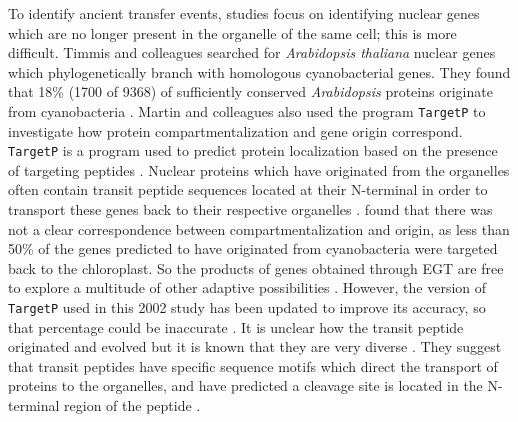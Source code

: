 \documentclass[a4paper,12pt]{article}
\newcommand{\tget}{\mbox{\texttt{TargetP}}\xspace}
\begin{document}
\begin{multicols}{2}
To identify ancient transfer events, studies focus on identifying
nuclear genes which are no longer present in the organelle of the
same cell; this is more difficult. Timmis and colleagues searched for
\textit{Arabidopsis thaliana} nuclear genes which phylogenetically branch
with homologous cyanobacterial genes. They found that 18\% (1700 of 9368)
of sufficiently conserved \textit{Arabidopsis} proteins originate from
cyanobacteria \citep{MartinEtAl2002}. Martin and colleagues also used the
program \tget \citep{Eman:00} to investigate how protein
compartmentalization and gene origin correspond. \tget is a program
used to predict protein localization based on the presence of targeting
peptides \citep{MartinEtAl2002}. Nuclear proteins which have originated
from the organelles often contain transit peptide sequences located
at their N-terminal in order to transport these genes back to their
respective organelles \citep{LeeEtAl2008}. \citet{MartinEtAl2002} found
that there was not a clear correspondence between compartmentalization
and origin, as less than 50\% of the genes predicted to have originated
from cyanobacteria were targeted back to the chloroplast. So the products of genes
obtained through EGT are free to explore a multitude of
other adaptive possibilities \citep{Martin2010}. However,
the version of \tget used in this 2002 study has been updated to
improve its accuracy, so that percentage could be inaccurate \citep{ArmenterosEtAl2019}. It is unclear how
the transit peptide originated and evolved but it is known that they are
very diverse \citep{LeeEtAl2008}. They suggest that transit peptides have
specific sequence motifs which direct the transport of proteins
to the organelles, and have predicted a cleavage site is located in the
N-terminal region of the peptide \citep{LeeEtAl2008}.


\end{multicols}
\end{document}

